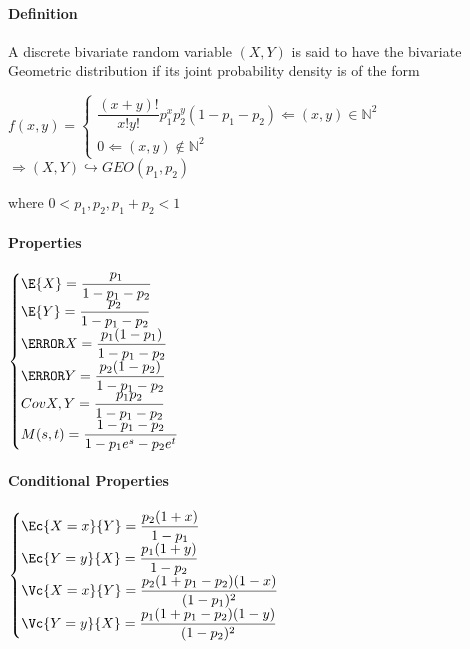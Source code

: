 \paragraph{Definition}
A discrete bivariate random variable $(X, Y )$ is said to have
the bivariate Geometric distribution if its joint probability density is of the
form
\begin{center}
	$f(x,y)=
	\begin{cases}	
		\dfrac{(x+y)!}{x!y!}p_{1}^{x}p_{2}^{y}(1-p_{1}-p_{2})\Leftarrow (x,y)\in\mathbb{N}^{2}\\
		0\Leftarrow (x,y)\not\in\mathbb{N}^{2} 
	\end{cases}$	
	$\Rightarrow \left( X,Y \right)\hookrightarrow GEO(p_{1},p_{2})
	$
\end{center}
where $0<p_{1},p_{2}, p_{1}+p_{2}<1$
\paragraph{Properties}
\begin{center}
	$
	\begin{cases}
		\E{X}=\dfrac{p_{1}}{1-p_{1}-p_{2}}\\
	\E{Y}=\dfrac{p_{2}}{1-p_{1}-p_{2}}\\
	\V{X}=\dfrac{p_{1}(1-p_{1})}{1-p_{1}-p_{2}}\\
	\V{Y}=\dfrac{p_{2}(1-p_{2})}{1-p_{1}-p_{2}}\\
	Cov{X,Y}=\dfrac{p_{1}p_{2}}{1-p_{1}-p_{2}}\\
	M(s,t)=\dfrac{1-p_{1}-p_{2}}{1-p_{1}e^{s}-p_{2}e^{t}}
	\end{cases}
	$
\end{center}
\paragraph{Conditional Properties}
\begin{center}
	$
	\begin{cases}
	\Ec{X=x}{Y}=\dfrac{p_{2}(1+x)}{1-p_{1}}\\
	\Ec{Y=y}{X}=\dfrac{p_{1}(1+y)}{1-p_{2}}\\
	\Vc{X=x}{Y}=\dfrac{p_{2}(1+p_{1}-p_{2})(1-x)}{(1-p_{1})^{2}}\\
	\Vc{Y=y}{X}=\dfrac{p_{1}(1+p_{1}-p_{2})(1-y)}{(1-p_{2})^{2}}
	\end{cases}
	$
\end{center}
